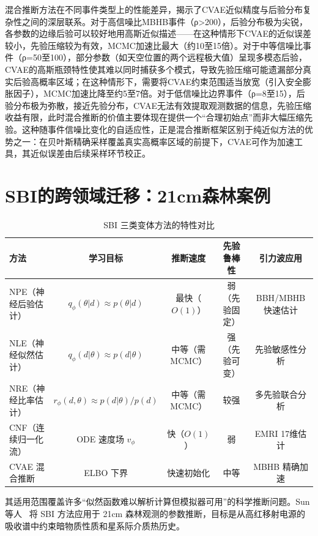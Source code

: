 混合推断方法在不同事件类型上的性能差异，揭示了CVAE近似精度与后验分布复杂性之间的深层联系。对于高信噪比MBHB事件（ρ>200），后验分布极为尖锐，各参数的边缘后验可以较好地用高斯近似描述——在这种情形下CVAE的近似误差较小，先验压缩较为有效，MCMC加速比最大（约10至15倍）。对于中等信噪比事件（ρ=50至100），部分参数（如天空位置的两个远程极大值）呈现多模态后验，CVAE的高斯瓶颈特性使其难以同时捕获多个模式，导致先验压缩可能遗漏部分真实后验高概率区域；在这种情形下，需要将CVAE约束范围适当放宽（引入安全膨胀因子），MCMC加速比降至约5至7倍。对于低信噪比边界事件（ρ=8至15），后验分布极为弥散，接近先验分布，CVAE无法有效提取观测数据的信息，先验压缩收益有限，此时混合推断的价值主要体现在提供一个“合理初始点”而非大幅压缩先验。这种随事件信噪比变化的自适应性，正是混合推断框架区别于纯近似方法的优势之一：在贝叶斯精确采样覆盖真实高概率区域的前提下，CVAE可作为加速工具，其近似误差由后续采样环节校正。

\section{SBI的跨领域迁移：21cm森林案例}

\begin{table}[htbp]
\centering
\caption{SBI 三类变体方法的特性对比}
\label{tab:sbi_variants}
\small
\begin{tabular}{lcccc}
\hline
\textbf{方法} & \textbf{学习目标} & \textbf{推断速度} & \textbf{先验鲁棒性} & \textbf{引力波应用} \\
\hline
NPE（神经后验估计） & $q_\phi(\theta|d) \approx p(\theta|d)$ & 最快（$O(1)$） & 弱（先验固定） & BBH/MBHB 快速估计 \\
NLE（神经似然估计） & $q_\phi(d|\theta) \approx p(d|\theta)$ & 中等（需 MCMC） & 强（先验可变） & 先验敏感性分析 \\
NRE（神经比率估计） & $r_\phi(d,\theta) \approx p(d|\theta)/p(d)$ & 中等（需 MCMC） & 较强 & 多先验联合分析 \\
CNF（连续归一化流） & ODE 速度场 $v_\phi$ & 快（$O(1)$） & 弱 & EMRI 17维估计 \\
CVAE 混合推断 & ELBO 下界 & 快速初始化 & 中等 & MBHB 精确加速 \\
\hline
\end{tabular}
\end{table}

其适用范围覆盖许多“似然函数难以解析计算但模拟器可用”的科学推断问题。Sun 等人~\cite{sun2025_21cm} 将 SBI 方法应用于 21cm 森林观测的参数推断，目标是从高红移射电源的吸收谱中约束暗物质性质和星系际介质热历史。

